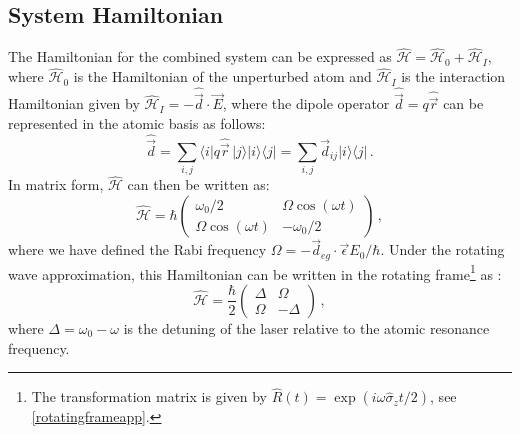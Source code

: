 \documentclass[../Thesis-IJspeert.tex]{subfiles}
\begin{document}
\subsection{System Hamiltonian}
\label{systemhamiltonian}
The Hamiltonian for the combined system can be expressed as $\hat{\mathcal{H}}=\hat{\mathcal{H}}_0+\hat{\mathcal{H}}_I$, where $\hat{\mathcal{H}}_0$ is the Hamiltonian of the unperturbed atom and $\hat{\mathcal{H}}_I$ is the interaction Hamiltonian given by $\hat{\mathcal{H}}_I=-\hat{\vec{d}}\cdot \vec{E}$, where the dipole operator $\hat{\vec{d}}=q\hat{\vec{r}}$ can be represented in the atomic basis as follows:
\begin{equation}
\hat{\vec{d}}=\sum_{i,j} \langle i \vert q \hat{\vec{r}}\, \vert j \rangle \vert i \rangle \langle j \vert  = \sum_{i,j} \vec{d}_{ij} \vert  i \rangle \langle j \vert\,.
\end{equation}
In matrix form, $\hat{\mathcal{H}}$ can then be written as:
\begin{equation}
\label{hamiltonian1}
\hat{\mathcal{H}}=\hbar
\begin{pmatrix} 
\omega_0/2 & \Omega\cos(\omega t)\\
\Omega\cos(\omega t) & -\omega_0/2
\end{pmatrix}
\,,
\end{equation}
where we have defined the Rabi frequency $\Omega=-\vec{d}_{eg}\cdot\vec{\epsilon}E_0/\hbar$. Under the rotating wave approximation, this Hamiltonian can be written in the rotating frame\footnote{The transformation matrix is given by $\hat{R}(t)=\exp(i\omega\hat{\sigma}_z t/2)$, see \autoref{rotatingframeapp}.} as \cite{loudon}:
\begin{equation}
\label{timeindependentH}
\hat{\mathcal{H}}=\frac{\hbar}{2}
\begin{pmatrix} 
\Delta& \Omega\\
\Omega& -\Delta
\end{pmatrix}\,,
\end{equation}
where $\Delta=\omega_0-\omega$ is the detuning of the laser relative to the atomic resonance frequency.
\end{document}
